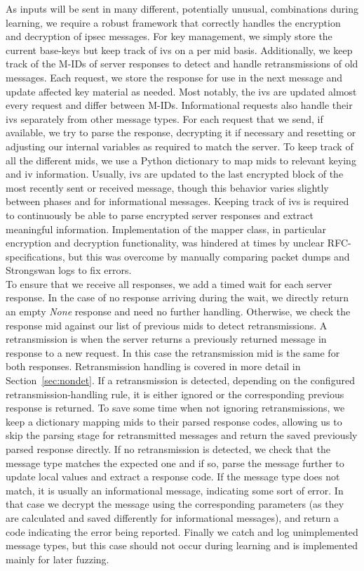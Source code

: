 As inputs will be sent in many different, potentially unusual, combinations during learning, we require a robust framework that correctly handles the encryption and decryption of \ac{ipsec} messages. For key management, we simply store the current base-keys but keep track of \acp{iv} on a per \ac{mid} basis. Additionally, we keep track of the M-IDs of server responses to detect and handle retransmissions of old messages. Each request, we store the response for use in the next message and update affected key material as needed. Most notably, the \acp{iv} are updated almost every request and differ between M-IDs. Informational requests also handle their \acp{iv} separately from other message types. For each request that we send, if available, we try to parse the response, decrypting it if necessary and resetting or adjusting our internal variables as required to match the server. To keep track of all the different \acp{mid}, we use a Python dictionary to map \acp{mid} to relevant keying and \ac{iv} information. Usually, \acp{iv} are updated to the last encrypted block of the most recently sent or received message, though this behavior varies slightly between phases and for informational messages. Keeping track of \acp{iv} is required to continuously be able to parse encrypted server responses and extract meaningful information. Implementation of the mapper class, in particular encryption and decryption functionality, was hindered at times by unclear RFC-specifications, but this was overcome by manually comparing packet dumps and Strongswan logs to fix errors.\\

To ensure that we receive all responses, we add a timed wait for each server response. In the case of no response arriving during the wait, we directly return an empty \textit{None} response and need no further handling. Otherwise, we check the response \ac{mid} against our list of previous \acp{mid} to detect retransmissions. A retransmission is when the server returns a previously returned message in response to a new request. In this case the retransmission \ac{mid} is the same for both responses. Retransmission handling is covered in more detail in Section~\ref{sec:nondet}. If a retransmission is detected, depending on the configured retransmission-handling rule, it is either ignored or the corresponding previous response is returned. To save some time when not ignoring retransmissions, we keep a dictionary mapping \acp{mid} to their parsed response codes, allowing us to skip the parsing stage for retransmitted messages and return the saved previously parsed response directly. If no retransmission is detected, we check that the message type matches the expected one and if so, parse the message further to update local values and extract a response code. If the message type does not match, it is usually an informational message, indicating some sort of error. In that case we decrypt the message using the corresponding parameters (as they are calculated and saved differently for informational messages), and return a code indicating the error being reported. Finally we catch and log unimplemented message types, but this case should not occur during learning and is implemented mainly for later fuzzing.

